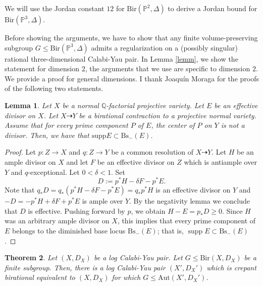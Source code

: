 \documentclass[a4paper,12pt,oneside]{amsart}
\numberwithin{equation}{section}
\newtheorem{theorem}{Theorem}[section]
\newtheorem{lemma}[theorem]{Lemma}
\theoremstyle{definition}
\theoremstyle{remark}
\begin{document}
We will use the Jordan constant $12$ for $\mathrm{Bir}(\mathbb P^2, \Delta)$ to derive a Jordan bound for $\mathrm{Bir}(\mathbb P^3, \Delta)$.

Before showing the arguments, we have to show that any finite volume-preserving subgroup $G\leqslant \mathrm{Bir}(\mathbb P^3, \Delta)$ admits a regularization on a (possibly singular) rational three-dimensional Calabi-Yau pair. In Lemma \ref{lemm}, we show the statement for dimension $2$, the arguments that we use are specific to dimension $2$. We provide a proof for general dimensions. I thank Joaquín Moraga for the proofs of the following two statements. 

\begin{lemma}
Let $X$ be a normal $\mathbb{Q}$-factorial projective variety. Let $E$ be an effective divisor on $X$. Let 
$X \dashrightarrow Y$ be a birational contraction to a projective normal variety. Assume that for every prime component 
$P$ of $E$, the center of $P$ on $Y$ is not a divisor. Then, we have that $\mathrm{supp} E \subset \mathrm{Bs}_{-}(E)$.
\end{lemma}

\begin{proof} Let $p : Z \to X$ and $q : Z \to Y$ be a common resolution of $X \dashrightarrow Y$.
Let $H$ be an ample divisor on $X$ and let $F$ be an effective divisor on $Z$ which is
antiample over $Y$ and $q$-exceptional. Let $0 < \delta < 1$. Set
\[
D := p^*H - \delta F - p^*E.
\]
Note that
$
q_*D = q_*(p^*H - \delta F - p^*E) = q_*p^*H
$
is an effective divisor on $Y$ and
$
-D = -p^*H + \delta F + p^*E
$
is ample over $Y$. By the
negativity lemma we conclude that $D$ is effective. Pushing forward by $p$, we obtain
$H - E = p_*D \ge 0.$ Since $H$ was an arbitrary ample divisor on $X$, this implies that every prime component of $E$ belongs to the diminished base locus $\mathrm{Bs}_{-}(E)$; that is,
$\operatorname{supp} E \subset \mathrm{Bs}_{-}(E)$. 
\end{proof}


\begin{theorem}
Let $(X,D_X)$ be a log Calabi-Yau pair. Let $G \leqslant \mathrm{Bir}(X,D_X)$ be a finite subgroup. Then, there is a log Calabi-Yau pair $(X',D_X')$ which is crepant birational equivalent to $(X,D_X)$ for which $G \leqslant \mathrm{Aut}(X',D_X')$.
\end{theorem}
\end{document}
